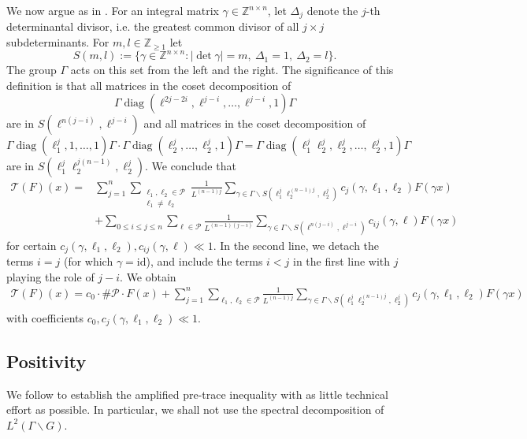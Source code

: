 \documentclass[11pt,oneside]{amsart}
\numberwithin{equation}{section}
\theoremstyle{remark}
\theoremstyle{plain}
\DeclareMathOperator{\diag}{diag}
\newcommand\id{\mathrm{id}}
\newcommand\ZZ{\mathbb{Z}}
\newcommand{\mcP}{\mathcal{P}}
\newcommand{\mcT}{\mathcal{T}}
\newcommand\bs{\backslash}
\renewcommand\leq{\leqslant}
\renewcommand\geq{\geqslant}
\begin{document}
We now argue as in \cite[\S6]{BM-IMRN}. For an integral matrix $\gamma \in \ZZ^{n\times n}$, let $\Delta_j$ denote the $j$-th determinantal divisor, i.e. the greatest common divisor of all $j\times j$ subdeterminants. For $m, l \in \ZZ_{\geq 1}$ let
\begin{equation}\label{Sml}
S(m, l) := \{\gamma \in \ZZ^{n\times n} : |\det \gamma| = m,\ \Delta_1 = 1,\ \Delta_2 = l \}.
\end{equation}
The group $\Gamma$ acts on this set from the left and the right. 
The significance of this definition is that all matrices in the coset decomposition of $$\Gamma \diag(\ell^{2j-2i}, \ell^{j-i}, \ldots, \ell^{j-i}, 1)\Gamma$$ are in $S(\ell^{n(j-i)}, \ell^{j-i})$ and all matrices in the coset decomposition of $$\Gamma \diag (\ell_1^j, 1, \ldots, 1) \Gamma \cdot \Gamma\diag(\ell_2^j, \ldots, \ell_2^j, 1)\Gamma = \Gamma\diag(\ell_1^j\ell_2^j, \ell_2^j, \ldots, \ell_2^j, 1)\Gamma$$ are in $S(\ell_1^j\ell_2^{j(n-1)}, \ell_2^j)$. We conclude that
\begin{equation*}
\begin{split}
\mcT(F)(x) = & \sum_{j=1}^n \sum_{\substack{\ell_1,\ell_2 \in \mcP \\ \ell_1\neq \ell_2}} \frac{1}{L^{(n-1)j}} \sum_{\gamma \in \Gamma\bs S(\ell_1^j\ell_2^{(n-1)j}, \ell_2^j)}c_j(\gamma, \ell_1, \ell_2) F(\gamma x) \\
&+ \sum_{0 \leq i \leq j \leq n} \sum_{\ell \in \mcP} \frac{1}{L^{(n-1)(j-i)}} \sum_{\gamma\in \Gamma\bs S(\ell^{n(j-i)}, \ell^{j-i})} c_{ij}(\gamma, \ell) F(\gamma x)
\end{split}
\end{equation*}
for certain $c_j(\gamma, \ell_1, \ell_2), c_{ij}(\gamma, \ell) \ll 1$. In the second line, we detach the terms $i = j$ (for which $\gamma=\id$), and include the terms $i<j$ in the first line with $j$ playing the role of $j-i$. We obtain
\begin{equation}\label{TT}
\begin{split}
\mcT(F)(x) = c_0 \cdot \# \mcP \cdot F( x) + \sum_{j=1}^n \sum_{\ell_1 ,\ell_2 \in \mcP} \frac{1}{L^{(n-1)j}} \sum_{\gamma \in \Gamma\bs S(\ell_1^j\ell_2^{(n-1)j}, \ell_2^j)}c_j(\gamma, \ell_1, \ell_2) F(\gamma x) 
\end{split}
\end{equation}
with coefficients $c_0, c_j(\gamma, \ell_1, \ell_2) \ll 1$. 

\subsection{Positivity}\label{subsec:positivity}
We follow \cite[\S3.2]{BHMM} to establish the amplified pre-trace inequality with as little technical effort as possible. In particular, we shall not use the spectral decomposition of $L^2(\Gamma \bs G)$.
\end{document}
